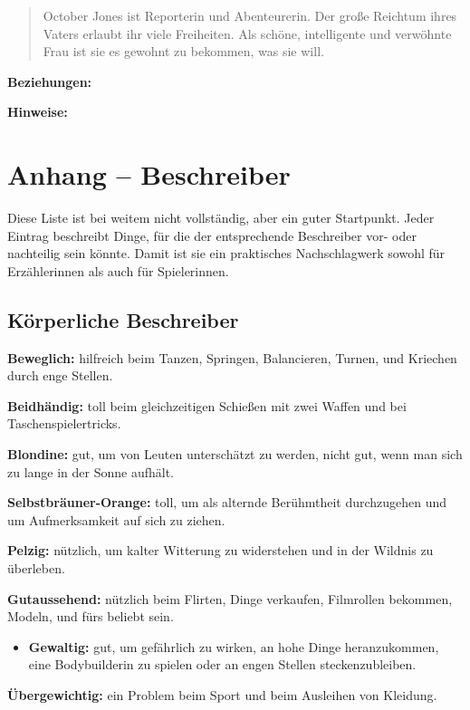 \documentclass[]{article}
\providecommand{\tightlist}{%
  \setlength{\itemsep}{0pt}\setlength{\parskip}{0pt}}
\begin{document}
\begin{quote}
October Jones ist Reporterin und Abenteurerin. Der große Reichtum ihres
Vaters erlaubt ihr viele Freiheiten. Als schöne, intelligente und
verwöhnte Frau ist sie es gewohnt zu bekommen, was sie will.
\end{quote}

\textbf{Beziehungen:}

\textbf{Hinweise:}

\section{Anhang -- Beschreiber}\label{anhang-beschreiber}

Diese Liste ist bei weitem nicht vollständig, aber ein guter Startpunkt.
Jeder Eintrag beschreibt Dinge, für die der entsprechende Beschreiber
vor- oder nachteilig sein könnte. Damit ist sie ein praktisches
Nachschlagwerk sowohl für Erzählerinnen als auch für Spielerinnen.

\subsection{Körperliche Beschreiber}\label{kuxf6rperliche-beschreiber}

\textbf{Beweglich:} hilfreich beim Tanzen, Springen, Balancieren,
Turnen, und Kriechen durch enge Stellen.

\textbf{Beidhändig:} toll beim gleichzeitigen Schießen mit zwei Waffen
und bei Taschenspielertricks.

\textbf{Blondine:} gut, um von Leuten unterschätzt zu werden, nicht gut,
wenn man sich zu lange in der Sonne aufhält.

\textbf{Selbstbräuner-Orange:} toll, um als alternde Berühmtheit
durchzugehen und um Aufmerksamkeit auf sich zu ziehen.

\textbf{Pelzig:} nützlich, um kalter Witterung zu widerstehen und in der
Wildnis zu überleben.

\textbf{Gutaussehend:} nützlich beim Flirten, Dinge verkaufen,
Filmrollen bekommen, Modeln, und fürs beliebt sein.

\begin{itemize}
\tightlist
\item
  \textbf{Gewaltig:} gut, um gefährlich zu wirken, an hohe Dinge
  heranzukommen, eine Bodybuilderin zu spielen oder an engen Stellen
  steckenzubleiben.
\end{itemize}

\textbf{Übergewichtig:} ein Problem beim Sport und beim Ausleihen von
Kleidung.
\end{document}
